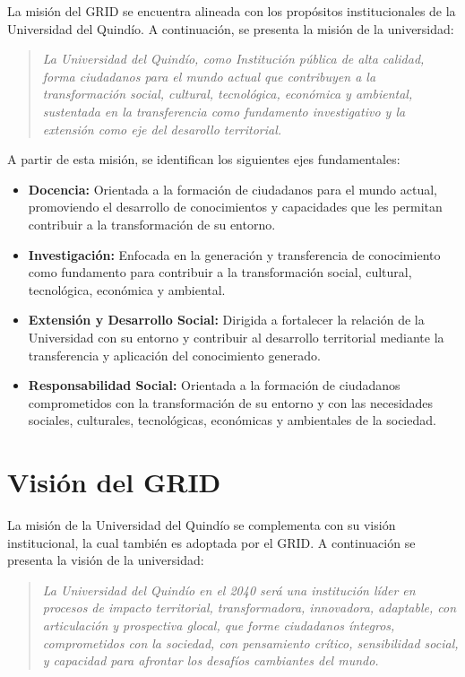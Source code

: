 La misión del \ac{GRID} se encuentra alineada con los propósitos institucionales de la Universidad del Quindío. A continuación, se presenta la misión de la universidad:

\begin{quote}
	\textit{La Universidad del Quindío, como Institución pública de alta calidad, forma ciudadanos para el mundo actual que contribuyen a la transformación social, cultural, tecnológica, económica y ambiental, sustentada en la transferencia como fundamento investigativo y la extensión como eje del desarollo territorial. \citep{uniquindio2026}}
\end{quote}

A partir de esta misión, se identifican los siguientes ejes fundamentales:

\begin{itemize}
	\item \textbf{Docencia:} Orientada a la formación de ciudadanos para el mundo actual, promoviendo el desarrollo de conocimientos y capacidades que les permitan contribuir a la transformación de su entorno.

	\item \textbf{Investigación:} Enfocada en la generación y transferencia de conocimiento como fundamento para contribuir a la transformación social, cultural, tecnológica, económica y ambiental.

	\item \textbf{Extensión y Desarrollo Social:} Dirigida a fortalecer la relación de la Universidad con su entorno y contribuir al desarrollo territorial mediante la transferencia y aplicación del conocimiento generado.

	\item \textbf{Responsabilidad Social:} Orientada a la formación de ciudadanos comprometidos con la transformación de su entorno y con las necesidades sociales, culturales, tecnológicas, económicas y ambientales de la sociedad.
\end{itemize}

\section{Visión del \texorpdfstring{\ac{GRID}}{GRID}}

La misión de la Universidad del Quindío se complementa con su visión institucional, la cual también es adoptada por el \ac{GRID}. A continuación se presenta la visión de la universidad:

\begin{quote}
	\textit{La Universidad del Quindío en el 2040 será una institución líder en procesos de impacto territorial, transformadora, innovadora, adaptable, con articulación y prospectiva glocal, que forme ciudadanos íntegros, comprometidos con la sociedad, con pensamiento crítico, sensibilidad social, y capacidad para afrontar los desafíos cambiantes del mundo. \citep{uniquindio2026}}
\end{quote}

